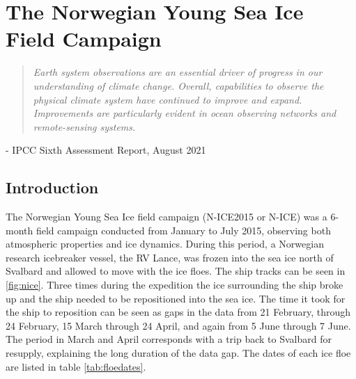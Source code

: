 \chapter{The Norwegian Young Sea Ice Field Campaign}
\vspace{1 cm}
\begin{spacing}{1} \begin{quote} 
\noindent \emph{Earth system observations are an essential driver of progress in our understanding of climate change. Overall, capabilities to observe the physical climate system have continued to improve and expand. Improvements are particularly evident in ocean observing networks and remote-sensing systems.} \end{quote}
\hspace{6 cm} - IPCC Sixth Assessment Report, August 2021  
\end{spacing}
\vspace{1 cm}

\section{Introduction}
The Norwegian Young Sea Ice field campaign (N-ICE2015 or N-ICE) was a 6-month field campaign conducted from January to July 2015, observing both atmospheric properties and ice dynamics. During this period, a Norwegian research icebreaker vessel, the RV Lance, was frozen into the sea ice north of Svalbard and allowed to move with the ice floes. The ship tracks can be seen in \ref{fig:nice}. Three times during the expedition the ice surrounding the ship broke up and the ship needed to be repositioned into the sea ice. The time it took for the ship to reposition can be seen as gaps in the data from 21 February, through 24 February, 15 March through 24 April, and again from 5 June through 7 June. The period in March and April corresponds with a trip back to Svalbard for resupply, explaining the long duration of the data gap. The dates of each ice floe are listed in table \ref{tab:floedates}. 

